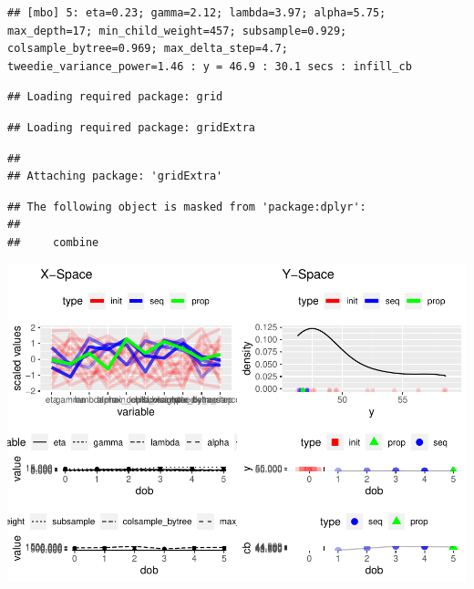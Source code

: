 \documentclass[
]{article}
\newenvironment{Shaded}{\begin{snugshade}}{\end{snugshade}}
\newcommand{\FunctionTok}[1]{\textcolor[rgb]{0.00,0.00,0.00}{#1}}
\newcommand{\NormalTok}[1]{#1}
\newcommand{\SpecialCharTok}[1]{\textcolor[rgb]{0.00,0.00,0.00}{#1}}
\begin{document}
\begin{verbatim}
## [mbo] 5: eta=0.23; gamma=2.12; lambda=3.97; alpha=5.75; max_depth=17; min_child_weight=457; subsample=0.929; colsample_bytree=0.969; max_delta_step=4.7; tweedie_variance_power=1.46 : y = 46.9 : 30.1 secs : infill_cb
\end{verbatim}

\begin{Shaded}
\end{Shaded}

\begin{verbatim}
## Loading required package: grid
\end{verbatim}

\begin{verbatim}
## Loading required package: gridExtra
\end{verbatim}

\begin{verbatim}
## 
## Attaching package: 'gridExtra'
\end{verbatim}

\begin{verbatim}
## The following object is masked from 'package:dplyr':
## 
##     combine
\end{verbatim}

\includegraphics{Artificial-Stupidity_files/figure-latex/unnamed-chunk-29-1.pdf}
\end{document}
